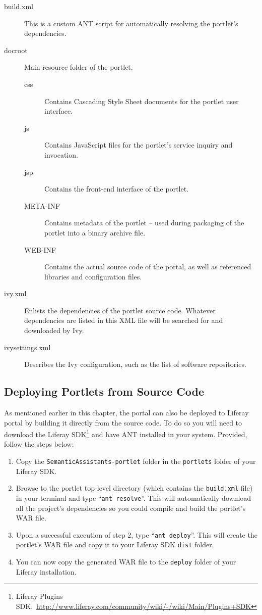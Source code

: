 \begin{description}
\item [build.xml] This is a custom ANT script for automatically resolving the portlet's dependencies.
\item [docroot] Main resource folder of the portlet.
\begin{description}
\item[css] Contains Cascading Style Sheet documents for the portlet user interface.
\item[js] Contains JavaScript files for the portlet's service inquiry and invocation.
\item[jsp] Contains the front-end interface of the portlet.
\item[META-INF] Contains metadata of the portlet -- used during packaging of the portlet into a binary archive file.
\item[WEB-INF] Contains the actual source code of the portal, as well as referenced libraries and configuration files.
\end{description}

\item [ivy.xml] Enlists the dependencies of the portlet source code. Whatever dependencies are listed in this XML file will be searched for and downloaded by Ivy.
\item [ivysettings.xml] Describes the Ivy configuration, such as the list of software repositories.
\end{description}

\subsection{Deploying Portlets from Source Code}
\label{sec:src_deploy}
As mentioned earlier in this chapter, the \sa portal can also be deployed to Liferay portal by building it directly from the source code. To do so you will need to download the Liferay SDK\footnote{Liferay Plugins SDK,~\url{http://www.liferay.com/community/wiki/-/wiki/Main/Plugins+SDK}} and have ANT installed in your system. Provided, follow the steps below:

\begin{enumerate}
\item Copy the \texttt{SemanticAssistants-portlet} folder in the \texttt{portlets} folder of your Liferay SDK.
\item Browse to the \sa portlet top-level directory (which contains the \texttt{build.xml} file) in your terminal and type ``\texttt{ant resolve}''. This will automatically download all the project's dependencies so you could compile and build the portlet's WAR file.
\item Upon a successful execution of step 2, type ``\texttt{ant deploy}''. This will create the portlet's WAR file and copy it to your Liferay SDK \texttt{dist} folder.
\item You can now copy the generated WAR file to the \texttt{deploy} folder of your Liferay installation.
\end{enumerate}

